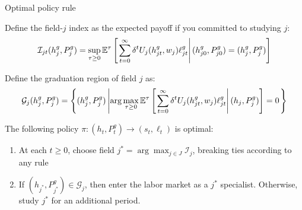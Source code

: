 \begin{frame}{Optimal policy rule}\label{model_optimal_rule}

Define the field-$j$ index as the expected payoff if you committed to studying $j$:
\begin{equation*}
\mathcal{I}_{jt} (h_{j}^g, P_{j}^g) = \sup_{\tau \geq 0} \mathbb{E}^\tau
\left[\left. 
   \sum_{t=0}^\infty \delta^t 
   U_j(h_{jt}^g, w_j) \ell_{jt}^g
 \right\vert 
    (h_{j0}^g, P_{j0}^g) = (h_{j}^g, P_{j}^g)
 \right]
\end{equation*}

Define the graduation region of field $j$ as: 
\begin{equation*}
\mathcal{G}_j (h_{j}^g, P_{j}^g)  = 
    \left\{
        (h_{j}^g, P_{j}^g) 
        \left\vert
            \arg \max_{\tau \geq 0} 
            \mathbb{E}^\tau 
            \left[\left. 
                \sum_{t=0}^\infty \delta^t 
                U_j(h_{jt}^g, w_j) \ell_{jt}^g
             \right\vert 
                (h_j, P_j^g)
             \right] = 0
   \right. \right\}
\end{equation*}

The following policy $\pi: (h_t, P_t^g) \to (s_t, \ell_t)$ is optimal: 
\begin{enumerate}
    \item At each $t \geq 0$, choose field $j^* = \arg \max_{j \in J} \mathcal{I}_j$, breaking ties according to any rule
    \item If $(h_{j^*}, P_{j^*}^g) \in \mathcal{G}_{j}$, then enter the labor market as a $j^*$ specialist. Otherwise, study $j^*$ for an additional period.  
\end{enumerate}

\hyperlink{id_model_notes}{}

\end{frame}



